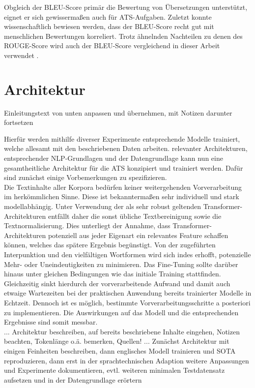\noindent
Obgleich der \ac{BLEU}-Score primär die Bewertung von Übersetzungen unterstützt, eignet er sich gewissermaßen auch für \ac{ATS}-Aufgaben. Zuletzt konnte wissenschaftlich bewiesen werden, dass der \ac{BLEU}-Score recht gut mit menschlichen Bewertungen korreliert. Trotz ähnelnden Nachteilen zu denen des \ac{ROUGE}-Score wird auch der \ac{BLEU}-Score vergleichend in dieser Arbeit verwendet \cite[S.~6-7]{PAP02}.


\section{Architektur}
\noindent
Einleitungstext von unten anpassen und übernehmen, mit Notizen darunter fortsetzen

\noindent
Hierfür werden mithilfe diverser Experimente entsprechende Modelle trainiert, welche allesamt mit den beschriebenen Daten arbeiten.
relevanter Architekturen, entsprechender \ac{NLP}-Grundlagen und der Datengrundlage kann nun eine gesamtheitliche Architektur für die \ac{ATS} konzipiert und trainiert werden. Dafür sind zunächst einige Vorbemerkungen zu spezifizieren.\\

\noindent
Die Textinhalte aller Korpora bedürfen keiner weitergehenden Vorverarbeitung im herkömmlichen Sinne. Diese ist bekanntermaßen sehr individuell und stark modellabhängig. Unter Verwendung der als sehr robust geltenden Transformer-Architekturen entfällt daher die sonst übliche Textbereinigung sowie die Textnormalisierung. Dies unterliegt der Annahme, dass Transformer-Architekturen potenziell aus jeder Eigenart ein relevantes Feature schaffen können, welches das spätere Ergebnis begünstigt. Von der zugeführten Interpunktion und den vielfältigen Wortformen wird sich indes erhofft, potenzielle Mehr- oder Uneindeutigkeiten zu minimieren. Das Fine-Tuning sollte darüber hinaus unter gleichen Bedingungen wie das initiale Training stattfinden. Gleichzeitig sinkt hierdurch der vorverarbeitende Aufwand und damit auch etwaige Wartezeiten bei der praktischen Anwendung bereits trainierter Modelle in Echtzeit. Dennoch ist es möglich, bestimmte Vorverarbeitungsschritte a posteriori zu implementieren. Die Auswirkungen auf das Modell und die entsprechenden Ergebnisse sind somit messbar.\\

... Architektur beschreiben, auf bereits beschriebene Inhalte eingehen, Notizen beachten, Tokenlänge o.ä. bemerken, Quellen!
... Zunächst Architektur mit einigen Feinheiten beschreiben, dann englisches Modell trainieren und SOTA reproduzieren, dann erst in der sprachtechnischen Adaption weitere Anpassungen und Experimente dokumentieren, evtl. weiteren minimalen Testdatensatz aufsetzen und in der Datengrundlage erörtern

